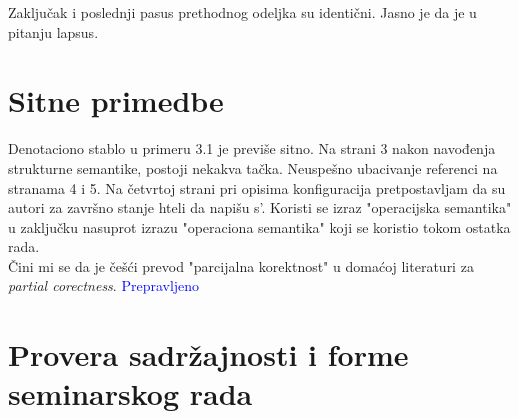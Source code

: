 \documentclass[a4paper]{report}
\newcommand{\odgovor}[1]{\textcolor{blue}{#1}}
\begin{document}
Zaključak i poslednji pasus prethodnog odeljka su identični. Jasno je da je u pitanju lapsus.

\section{Sitne primedbe}
Denotaciono stablo u primeru 3.1 je previše sitno.
Na strani 3 nakon navođenja strukturne semantike, postoji nekakva tačka.
Neuspešno ubacivanje referenci na stranama 4 i 5.
Na četvrtoj strani pri opisima konfiguracija pretpostavljam da su autori za završno stanje hteli da napišu s'.
Koristi se izraz "operacijska semantika" u zaključku nasuprot izrazu "operaciona semantika"  koji se koristio tokom ostatka rada. \\
Čini mi se da je češći prevod "parcijalna korektnost" u domaćoj literaturi za {\em partial corectness}. \odgovor{Prepravljeno}
\section{Provera sadržajnosti i forme seminarskog rada}
\end{document}
